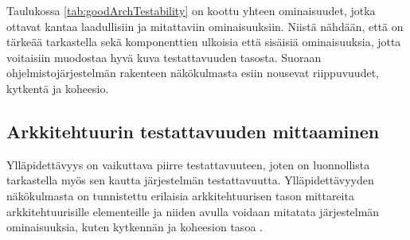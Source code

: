 \documentclass[finnish]{tktltiki2}
\numberwithin{table}{section}
\theoremstyle{definition}
\theoremstyle{remark}
\begin{document}
\noindent
Taulukossa \ref{tab:goodArchTestability} on koottu yhteen ominaisuudet, jotka ottavat kantaa laadullisiin ja mitattaviin ominaisuuksiin. Niistä nähdään, että on tärkeää tarkastella sekä komponenttien ulkoisia että sisäisiä ominaisuuksia, jotta voitaisiin muodostaa hyvä kuva testattavuuden tasosta. Suoraan ohjelmistojärjestelmän rakenteen näkökulmasta esiin nousevat riippuvuudet, kytkentä ja koheesio.


\subsection{Arkkitehtuurin testattavuuden mittaaminen} \label{arch_testability_measurement}

Ylläpidettävyys on vaikuttava piirre testattavuuteen, joten on luonnollista tarkastella myös sen kautta järjestelmän testattavuutta. Ylläpidettävyyden näkökulmasta on tunnistettu erilaisia arkkitehtuurisen tason mittareita arkkitehtuurisille elementeille ja niiden avulla voidaan mitatata järjestelmän ominaisuuksia, kuten kytkennän ja koheesion tasoa \citep{bengtsson1998towards}.  

\iffalse


\begin{itemize}
	\item metodien määrä elementin rajapinnassa
	\item paikkamerkkien (placeholder) määrä arkkitehtuurisille elementeille, joiden avulla elementti parametrisoidaan
	\item elementistä lähtevien viestien määrä
	\item elementtityyppien määrä, joita tarkasteltava elementti toteuttaa (implement)
	\item elementtien määrä, jotka toteuttavat tarkasteltavan elementin tyypin
	\item saatavilla olevien metodien lukumäärä muista elementeistä, jotka ovat yhteydessä tarkasteltavaan elementtiin
	\item elementin metodien ja parametrien määrä
\end{itemize}
\fi
\end{document}
